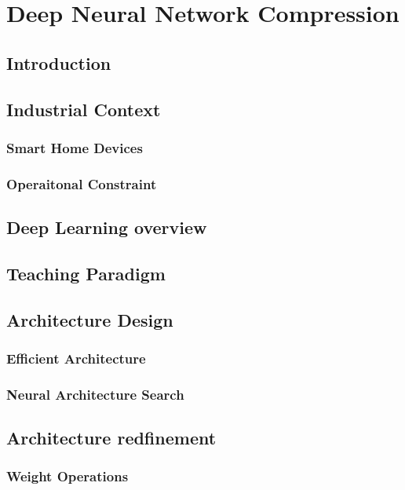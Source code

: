 \chapter{Deep Neural Network Compression}
\label{chap:sota}


\localtableofcontents

\section{Introduction}
\section{Industrial Context}
    \subsection{Smart Home Devices}
    \subsection{Operaitonal Constraint}
\section{Deep Learning overview}
\section{Teaching Paradigm}
\section{Architecture Design}
    \subsection{Efficient Architecture}
    \subsection{Neural Architecture Search}
\section{Architecture redfinement}
\subsection{Weight Operations}
